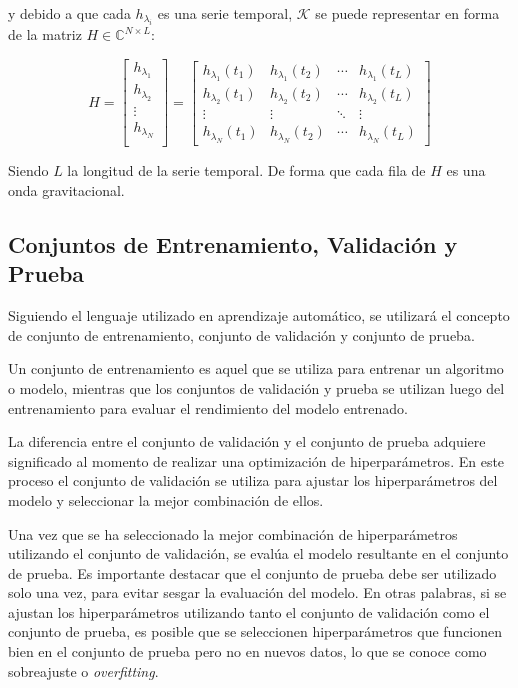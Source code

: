 y debido a que cada $h_{\lambda_i}$ es una serie temporal, $\mathcal{K}$ se puede representar en forma de la matriz $H \in \mathbb{C}^{N\times L}$:

\[
H = 
\begin{bmatrix}
h_{\lambda_1} \\
h_{\lambda_2} \\
 \vdots \\
 h_{\lambda_N} \\
\end{bmatrix}
= 
\begin{bmatrix}
h_{\lambda_1}(t_1) & h_{\lambda_1}(t_2)  & \cdots & h_{\lambda_1}(t_L)\\
 h_{\lambda_2}(t_1) & h_{\lambda_2}(t_2)  & \cdots & h_{\lambda_2}(t_L)\\
 \vdots & \vdots & \ddots &  \vdots \\
h_{\lambda_N}(t_1) & h_{\lambda_N}(t_2)  & \cdots & h_{\lambda_N}(t_L)
\end{bmatrix}
\]

Siendo $L$ la longitud de la serie temporal. De forma que cada fila de $H$ es una onda gravitacional.

\subsection*{Conjuntos de Entrenamiento, Validación y Prueba}

Siguiendo el lenguaje utilizado en aprendizaje automático, se utilizará el concepto de conjunto de entrenamiento, conjunto de validación y conjunto de prueba.

Un conjunto de entrenamiento es aquel que se utiliza para entrenar un algoritmo o modelo, mientras que los conjuntos de validación y prueba se utilizan luego del entrenamiento para evaluar el rendimiento del modelo entrenado.

La diferencia entre el conjunto de validación y el conjunto de prueba adquiere significado al momento de realizar una optimización de hiperparámetros. En este proceso el conjunto de validación se utiliza para ajustar los hiperparámetros del modelo y seleccionar la mejor combinación de ellos.

Una vez que se ha seleccionado la mejor combinación de hiperparámetros utilizando el conjunto de validación, se evalúa el modelo resultante en el conjunto de prueba. Es importante destacar que el conjunto de prueba debe ser utilizado solo una vez, para evitar sesgar la evaluación del modelo. En otras palabras, si se ajustan los hiperparámetros utilizando tanto el conjunto de validación como el conjunto de prueba, es posible que se seleccionen hiperparámetros que funcionen bien en el conjunto de prueba pero no en nuevos datos, lo que se conoce como sobreajuste o \textit{overfitting}.




